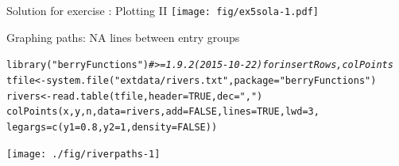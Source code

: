 \documentclass[xcolor=table,       handout,    xcolor=dvipsnames]{beamer}\usepackage[]{graphicx}\usepackage[]{color}
\makeatletter
\newcommand{\hlnum}[1]{\textcolor[rgb]{0,0,0}{#1}}
\newcommand{\hlstr}[1]{\textcolor[rgb]{0.545,0.137,0.137}{#1}}
\newcommand{\hlcom}[1]{\textcolor[rgb]{0,0.392,0}{\textit{#1}}}
\newcommand{\hlstd}[1]{\textcolor[rgb]{0,0,0}{#1}}
\newcommand{\hlkwb}[1]{\textcolor[rgb]{0,0,0}{#1}}
\newcommand{\hlkwc}[1]{\textcolor[rgb]{1,0,1}{#1}}
\newcommand{\hlkwd}[1]{\textcolor[rgb]{0,0,1}{#1}}
\newenvironment{kframe}{%
 \def\at@end@of@kframe{}%
 \ifinner\ifhmode%
  \def\at@end@of@kframe{\end{minipage}}%
  \begin{minipage}{\columnwidth}%
 \fi\fi%
 \def\FrameCommand##1{\hskip\@totalleftmargin \hskip-\fboxsep
 \colorbox{shadecolor}{##1}\hskip-\fboxsep
     \hskip-\linewidth \hskip-\@totalleftmargin \hskip\columnwidth}%
 \MakeFramed {\advance\hsize-\width
   \@totalleftmargin\z@ \linewidth\hsize
   \@setminipage}}%
 {\par\unskip\endMakeFramed%
 \at@end@of@kframe}
\newenvironment{knitrout}{}{} %
\newcounter{exercisecount}
\makeatother
\begin{document}

\begin{frame}[fragile]{Solution for exercise : Plotting II}
\texttt{[image: fig/ex5sola-1.pdf]}
\end{frame}


\begin{frame}[fragile]{Graphing paths: NA lines between entry groups}
\begin{knitrout}\scriptsize
{}\color{fgcolor}\begin{kframe}
\begin{alltt}
\hlkwd{library}\hlstd{(}\hlstr{"berryFunctions"}\hlstd{)} \hlcom{# >= 1.9.2 (2015-10-22) for insertRows, colPoints}
\hlstd{tfile} \hlkwb{<-} \hlkwd{system.file}\hlstd{(}\hlstr{"extdata/rivers.txt"}\hlstd{,} \hlkwc{package}\hlstd{=}\hlstr{"berryFunctions"}\hlstd{)}
\hlstd{rivers} \hlkwb{<-} \hlkwd{read.table}\hlstd{(tfile,} \hlkwc{header}\hlstd{=}\hlnum{TRUE}\hlstd{,} \hlkwc{dec}\hlstd{=}\hlstr{","}\hlstd{)}
\hlkwd{colPoints}\hlstd{(x,y,n,} \hlkwc{data}\hlstd{=rivers,} \hlkwc{add}\hlstd{=}\hlnum{FALSE}\hlstd{,} \hlkwc{lines}\hlstd{=}\hlnum{TRUE}\hlstd{,} \hlkwc{lwd}\hlstd{=}\hlnum{3}\hlstd{,}
          \hlkwc{legargs}\hlstd{=}\hlkwd{c}\hlstd{(}\hlkwc{y1}\hlstd{=}\hlnum{0.8}\hlstd{,}\hlkwc{y2}\hlstd{=}\hlnum{1}\hlstd{,} \hlkwc{density}\hlstd{=}\hlnum{FALSE}\hlstd{) )}
\end{alltt}
\end{kframe}

{\centering \texttt{[image: ./fig/riverpaths-1]} 

}



\end{knitrout}
\end{frame}

\end{document}
